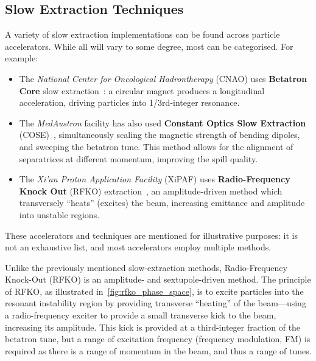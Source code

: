 \documentclass[11pt]{report}
\begin{document}
\subsection{Slow Extraction Techniques}\label{sec:rfko}


A variety of slow extraction implementations can be found across particle accelerators. While all will vary to some degree, most can be categorised. For example:
\begin{itemize}
  \item The \textit{National Center for Oncological Hadrontherapy} (CNAO) uses \textbf{Betatron Core} slow extraction~\cite{Falbo:IPAC2018-TUZGBF3}: a circular magnet produces a longitudinal acceleration, driving particles into 1/3rd-integer resonance.
  \item The \textit{MedAustron} facility has also used \textbf{Constant Optics Slow Extraction} (COSE)~\cite{ArrutiaSota:2845862}, simultaneously scaling the magnetic strength of bending dipoles, and sweeping the betatron tune. This method allows for the alignment of separatrices at different momentum, improving the spill quality.
  \item The \textit{Xi’an Proton Application Facility} (XiPAF) uses \textbf{Radio-Frequency Knock Out} (RFKO) extraction~\cite{Yao:2016cnf}, an amplitude-driven method which transversely ``heats'' (excites) the beam, increasing emittance and amplitude into unstable regions.
\end{itemize}
These accelerators and techniques are mentioned for illustrative purposes: it is not an exhaustive list, and most accelerators employ multiple methods.

 

Unlike the previously mentioned slow-extraction methods, Radio-Frequency Knock-Out (RFKO) is an amplitude- and sextupole-driven method. The principle of RFKO, as illustrated in~\autoref{fig:rfko_phase_space}, is to excite particles into the resonant instability region by providing transverse ``heating'' of the beam---using a radio-frequency exciter to provide a small transverse kick to the beam, increasing its amplitude. This kick is provided at a third-integer fraction of the betatron tune, but a range of excitation frequency (frequency modulation, FM) is required as there is a range of momentum in the beam, and thus a range of tunes. 
\end{document}
